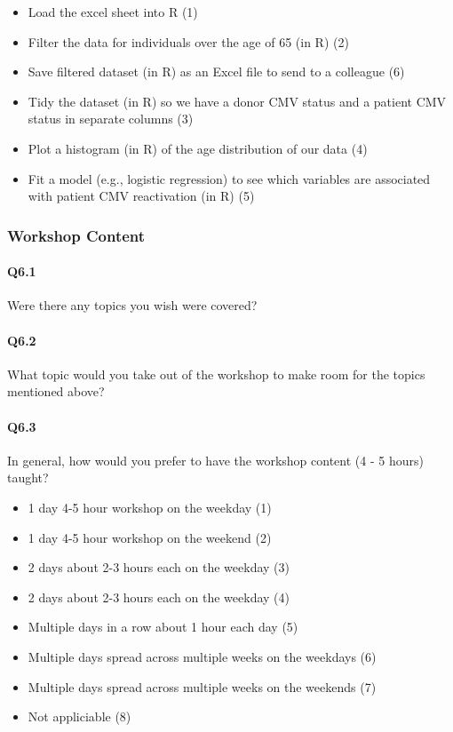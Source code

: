 \documentclass[030-workshop.tex]{subfiles}
\begin{document}
    \begin{itemize}
        \item Load the excel sheet into R (1)
        \item Filter the data for individuals over the age of 65 (in R) (2)
        \item Save filtered dataset (in R) as an Excel file to send to a colleague (6)
        \item Tidy the dataset (in R) so we have a donor CMV status and a patient CMV status in separate columns (3)
        \item Plot a histogram (in R) of the age distribution of our data (4)
        \item Fit a model (e.g., logistic regression) to see which variables are associated with patient CMV reactivation  (in R) (5)
    \end{itemize}

\subsubsection{Workshop Content}

    \paragraph{Q6.1}

        Were there any topics you wish were covered?

    \paragraph{Q6.2}

        What topic would you take out of the workshop to make room for the topics mentioned above?

    \paragraph{Q6.3}

        In general, how would you prefer to have the workshop content (4 - 5 hours) taught?

    \begin{itemize}
        \item 1 day 4-5 hour workshop on the weekday  (1)
        \item 1 day 4-5 hour workshop on the weekend  (2)
        \item 2 days about 2-3 hours each on the weekday  (3)
        \item 2 days about 2-3 hours each on the weekday  (4)
        \item Multiple days in a row about 1 hour each day  (5)
        \item Multiple days spread across multiple weeks on the weekdays  (6)
        \item Multiple days spread across multiple weeks on the weekends  (7)
        \item Not appliciable  (8)
    \end{itemize}
\end{document}
